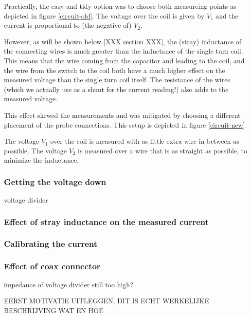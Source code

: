 Practically, the easy and tidy option was to choose both measureing points 
as depicted in figure \ref{circuit-old}. The voltage over the coil is given 
by $V_1$ and the current is proportional to (the negative of) $V_2$.


However, as will be shown below [XXX section XXX], the (stray) inductance 
of the connecting wires is much greater than the inductance of the single 
turn coil. This means that the wire coming from the capacitor and leading 
to the coil, and the wire from the switch to the coil both have a much 
higher effect on the measured voltage than the single turn coil itself.  
The resistance of the wires (which we actually use as a shunt for the 
current reading!) also adds to the measured voltage.

This effect skewed the measurements and was mitigated by choosing a 
different placement of the probe connections. This setup is depicted in 
figure \ref{circuit-new}.


The voltage $V_1$ over the coil is measured with as little extra wire in 
between as possible. The voltage $V_2$ is measured over a wire that is as 
straight as possible, to minimize the inductance.

\subsubsection{Getting the voltage down}
voltage divider

\subsubsection{Effect of stray inductance on the measured current}

\subsubsection{Calibrating the current}

\subsubsection{Effect of coax connector}
impedance of voltage divider still too high?

EERST MOTIVATIE UITLEGGEN, DIT IS ECHT WERKELIJKE BESCHRIJVING WAT EN HOE



